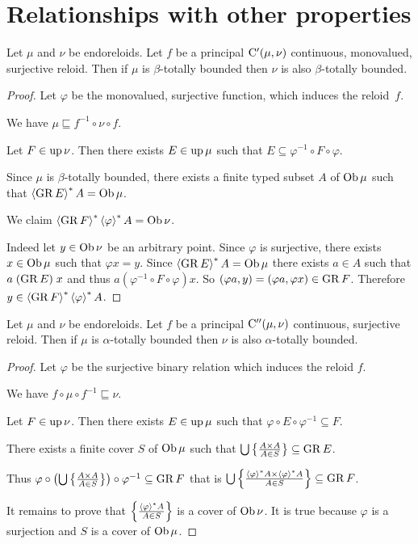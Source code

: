 \section{Relationships with other properties}
\begin{thm}
Let $\mu$ and $\nu$ be endoreloids. Let $f$ be a principal $\mathrm{C}'(\mu,\nu)$
continuous, monovalued, surjective reloid. Then if $\mu$ is $\beta$-totally
bounded then $\nu$ is also $\beta$-totally bounded.\end{thm}
\begin{proof}
Let $\varphi$ be the monovalued, surjective function, which induces
the reloid~$f$.

We have $\mu\sqsubseteq f^{-1}\circ\nu\circ f$.

Let $F\in\operatorname{up}\nu$. Then there exists $E\in\operatorname{up}\mu$ such that $E\subseteq\varphi^{-1}\circ F\circ\varphi$.

Since $\mu$ is $\beta$-totally bounded, there exists a finite typed
subset $A$ of $\operatorname{Ob}\mu$ such that $\left\langle \operatorname{GR} E\right\rangle ^{\ast}A=\operatorname{Ob}\mu$.

We claim $\left\langle \operatorname{GR} F\right\rangle ^{\ast}\left\langle \varphi\right\rangle ^{\ast}A=\operatorname{Ob}\nu$.

Indeed let $y\in\operatorname{Ob}\nu$ be an arbitrary point. Since $\varphi$ is
surjective, there exists $x\in\operatorname{Ob}\mu$ such that $\varphi x=y$. Since
$\left\langle \operatorname{GR} E\right\rangle ^{\ast}A=\operatorname{Ob}\mu$ there exists $a\in A$ such that $a\mathrel{(\operatorname{GR} E)}x$
and thus $a\mathrel{(\varphi^{-1}\circ F\circ\varphi)}x$. So $(\varphi a,y)=(\varphi a,\varphi x)\in\operatorname{GR} F$.
Therefore $y\in\left\langle \operatorname{GR} F\right\rangle ^{\ast}\left\langle \varphi\right\rangle ^{\ast}A$.\end{proof}
\begin{thm}
Let $\mu$ and $\nu$ be endoreloids. Let $f$ be a principal $\mathrm{C}''(\mu,\nu)$
continuous, surjective reloid. Then if $\mu$ is $\alpha$-totally
bounded then $\nu$ is also $\alpha$-totally bounded.\end{thm}
\begin{proof}
Let $\varphi$ be the surjective binary relation which induces the
reloid $f$.

We have $f\circ\mu\circ f^{-1}\sqsubseteq\nu$.

Let $F\in\operatorname{up}\nu$. Then there exists $E\in\operatorname{up}\mu$ such that $\varphi\circ E\circ\varphi^{-1}\subseteq F$.

There exists a finite cover $S$ of $\operatorname{Ob}\mu$ such that $\bigcup\left\{ \frac{A\times A}{A\in S}\right\}\subseteq\operatorname{GR} E$.

Thus $\varphi\circ\left(\bigcup\left\{ \frac{A\times A}{A\in S}\right\}\right)\circ\varphi^{-1}\subseteq\operatorname{GR} F$
that is $\bigcup\left\{ \frac{\left\langle \varphi\right\rangle ^{\ast}A\times\left\langle \varphi\right\rangle ^{\ast}A}{A\in S}\right\}\subseteq\operatorname{GR} F$.

It remains to prove that $\left\{ \frac{\left\langle \varphi\right\rangle ^{\ast}A}{A\in S}\right\}$ is
a cover of $\operatorname{Ob}\nu$. It is true because $\varphi$ is a surjection
and $S$ is a cover of $\operatorname{Ob}\mu$.
\end{proof}
